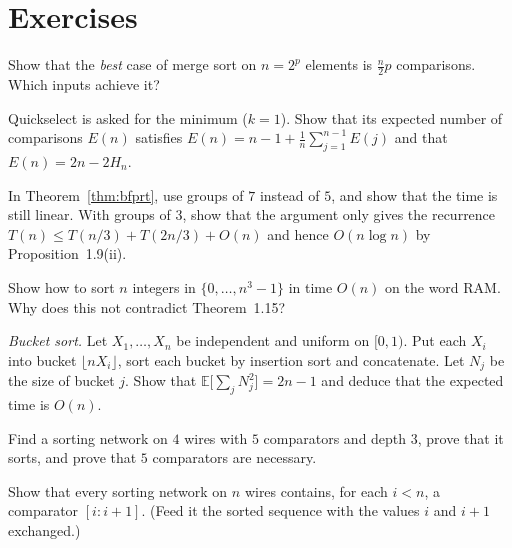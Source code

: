 \section{Exercises}

\begin{exercise}[$\star$]\label{ex:bestmerge}
Show that the \emph{best} case of merge sort on $n=2^p$ elements is $\frac n2p$ comparisons. Which inputs achieve it?
\end{exercise}

\begin{exercise}[$\star\star$]\label{ex:qselectmin}
Quickselect is asked for the minimum ($k=1$). Show that its expected number of comparisons $E(n)$ satisfies $E(n)=n-1+\frac1n\sum_{j=1}^{n-1}E(j)$ and that $E(n)=2n-2H_n$.
\end{exercise}

\begin{exercise}[$\star\star$]\label{ex:groups}
In Theorem~\ref{thm:bfprt}, use groups of $7$ instead of $5$, and show that the time is still linear. With groups of $3$, show that the argument only gives the recurrence
$T(n)\le T(n/3)+T(2n/3)+O(n)$ and hence $O(n\log n)$ by Proposition~1.9(ii).
\end{exercise}

\begin{exercise}[$\star$]\label{ex:radixbase}
Show how to sort $n$ integers in $\{0,\dots,n^3-1\}$ in time $O(n)$ on the word RAM. Why does this not contradict Theorem~1.15?
\end{exercise}

\begin{exercise}[$\star\star$]\label{ex:bucket}
\emph{Bucket sort.} Let $X_1,\dots,X_n$ be independent and uniform on $[0,1)$. Put each $X_i$ into bucket $\lfloor nX_i\rfloor$, sort each bucket by insertion sort and concatenate.
Let $N_j$ be the size of bucket $j$. Show that $\mathbb E\bigl[\sum_jN_j^2\bigr]=2n-1$ and deduce that the expected time is $O(n)$.
\end{exercise}

\begin{exercise}[$\star$]\label{ex:fourwires}
Find a sorting network on $4$ wires with $5$ comparators and depth $3$, prove that it sorts, and prove that $5$ comparators are necessary.
\end{exercise}

\begin{exercise}[$\star\star$]\label{ex:adjacent}
Show that every sorting network on $n$ wires contains, for each $i<n$, a comparator $[i:i+1]$. (Feed it the sorted sequence with the values $i$ and $i+1$ exchanged.)
\end{exercise}

